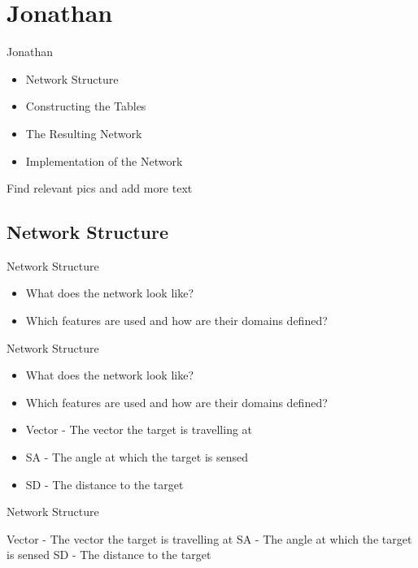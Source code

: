 \section{Jonathan}
\begin{frame}{Jonathan}
\begin{itemize}
\item Network Structure
\item Constructing the Tables
\item The Resulting Network
\item Implementation of the Network
\end{itemize}
Find relevant pics and add more text
\end{frame}

\subsection{Network Structure}
\begin{frame}{Network Structure}
\begin{itemize}
\item What does the network look like?
\item Which features are used and how are their domains defined?
\end{itemize}
\end{frame}

\begin{frame}{Network Structure}
\begin{itemize}
\item What does the network look like?
\item Which features are used and how are their domains defined?
\end{itemize}
\begin{itemize}
  \item Vector - The vector the target is travelling at
  \item SA - The angle at which the target is sensed
  \item SD - The distance to the target
\end{itemize}
\end{frame}

\begin{frame}{Network Structure}

Vector - The vector the target is travelling at
SA - The angle at which the target is sensed
SD - The distance to the target
\end{frame}

